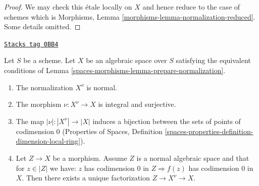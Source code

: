 \begin{proof}
We may check this \'etale locally on $X$ and hence reduce to the case
of schemes which is
Morphisms, Lemma \ref{morphisms-lemma-normalization-reduced}.
Some details omitted.
\end{proof}

\begin{lemma}
\label{spaces-morphisms-lemma-normalization-normal}
\href{https://stacks.math.columbia.edu/tag/0BB4}{\texttt{Stacks tag 0BB4}}

Let $S$ be a scheme. Let $X$ be an algebraic space over $S$ satisfying the
equivalent conditions of Lemma \ref{spaces-morphisms-lemma-prepare-normalization}.
\begin{enumerate}
\item The normalization $X^\nu$ is normal.
\item The morphism $\nu : X^\nu \to X$ is integral and surjective.
\item The map $|\nu| : |X^\nu| \to |X|$ induces a bijection between
the sets of points of codimension $0$ (Properties of Spaces,
Definition \ref{spaces-properties-definition-dimension-local-ring}).
\item Let $Z \to X$ be a morphism. Assume $Z$ is a normal algebraic space
and that for $z \in |Z|$ we have: $z$ has codimension $0$ in
$Z \Rightarrow f(z)$ has codimension $0$ in $X$. Then
there exists a unique factorization $Z \to X^\nu \to X$.
\end{enumerate}
\end{lemma}

